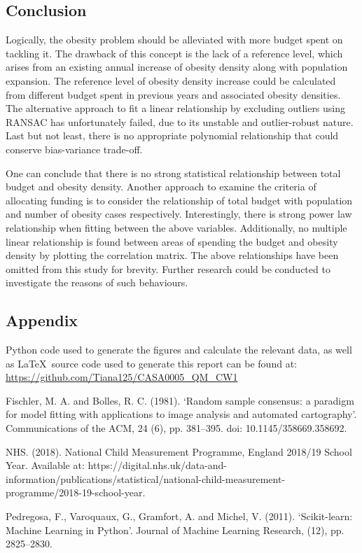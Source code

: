 \documentclass[12pt]{article}
\begin{document}
\subsection{Conclusion}
Logically, the obesity problem should be alleviated with more budget spent on tackling it. The drawback of this concept is the lack of a reference level, which arises from an existing annual increase of obesity density along with population expansion. The reference level of obesity density increase could be calculated from different budget spent in previous years and associated obesity densities. The alternative approach to fit a linear relationship by excluding outliers using RANSAC has unfortunately failed, due to its unstable and outlier-robust nature. Last but not least, there is no appropriate polynomial relationship that could conserve bias-variance trade-off. 

One can conclude that there is no strong statistical relationship between total budget and obesity density. Another approach to examine the criteria of allocating funding is to consider the relationship of total budget with population and number of obesity cases respectively. Interestingly, there is strong power law relationship when fitting between the above variables. Additionally, no multiple linear relationship is found between areas of spending the budget and obesity density by plotting the correlation matrix. The above relationships have been omitted from this study for brevity. Further research could be conducted to investigate the reasons of such behaviours. 


\subsection{Appendix}
Python code used to generate the figures and calculate the relevant data, as well as \LaTeX\  source code used to generate this report can be found at: \url{https://github.com/Tiana125/CASA0005_QM_CW1}


\newpage

\appendix



Fischler, M. A. and Bolles, R. C. (1981). ‘Random sample consensus: a paradigm for model fitting with applications to image analysis and automated cartography’. Communications of the ACM, 24 (6), pp. 381–395. doi: 10.1145/358669.358692.


NHS. (2018). National Child Measurement Programme, England 2018/19 School Year. Available at: https://digital.nhs.uk/data-and-information/publications/statistical/national-child-measurement-programme/2018-19-school-year.


Pedregosa, F., Varoquaux, G., Gramfort, A. and Michel, V. (2011). ‘Scikit-learn: Machine Learning in Python’. Journal of Machine Learning Research, (12), pp. 2825–2830.
\end{document}
